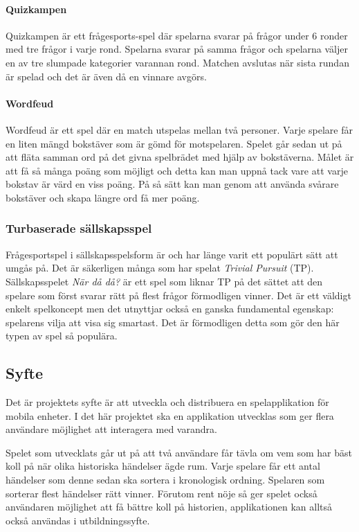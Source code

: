 \documentclass[12pt,a4paper]{article}
\begin{document}
\paragraph{Quizkampen \newline} 
Quizkampen är ett frågesports-spel där spelarna svarar på frågor under 6 ronder med tre frågor i varje rond. Spelarna svarar på samma frågor och spelarna väljer en av tre slumpade kategorier varannan rond. Matchen avslutas när sista rundan är spelad och det är även då  en vinnare avgörs. \cite{aboutquiz}

\paragraph{Wordfeud \newline}
Wordfeud är ett spel där en match utspelas mellan två personer. Varje spelare får en liten mängd bokstäver som är gömd för motspelaren. Spelet går sedan ut på att fläta samman ord på det givna spelbrädet med hjälp av bokstäverna. Målet är att få så många poäng som möjligt och detta kan man uppnå tack vare att varje bokstav är värd en viss poäng. På så sätt kan man genom att använda svårare bokstäver och skapa längre ord få mer poäng. \cite{aboutwordfeud}

\subsubsection{Turbaserade sällskapsspel}

Frågesportspel i sällskapsspelsform är och har länge varit ett populärt sätt att umgås på\cite{tp}. Det är säkerligen många som har spelat \textit{Trivial Pursuit} (TP). Sällskapsspelet \textit{När då då?} är ett spel som liknar TP på det sättet att den spelare som först svarar rätt på flest frågor förmodligen vinner. Det är ett väldigt enkelt spelkoncept men det utnyttjar också en ganska fundamental egenskap: spelarens vilja att visa sig smartast. Det är förmodligen detta som gör den här typen av spel så populära.

\subsection{Syfte}
Det är projektets syfte är att utveckla och distribuera en spelapplikation för mobila enheter. I det här projektet ska en applikation utvecklas som ger flera användare möjlighet att interagera med varandra.

Spelet som utvecklats går ut på att två användare får tävla om vem som har bäst koll på när olika historiska händelser ägde rum. Varje spelare får ett antal händelser som denne sedan ska sortera i kronologisk ordning. Spelaren som sorterar flest händelser rätt vinner. Förutom rent nöje så ger spelet också användaren möjlighet att få bättre koll på historien, applikationen kan alltså också användas i utbildningssyfte.
\end{document}
